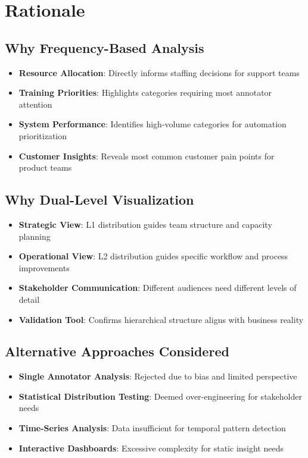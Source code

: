 \documentclass[11pt]{article}
\begin{document}
\section{Rationale}

\subsection{Why Frequency-Based Analysis}
\begin{itemize}
\item \textbf{Resource Allocation}: Directly informs staffing decisions for support teams
\item \textbf{Training Priorities}: Highlights categories requiring most annotator attention
\item \textbf{System Performance}: Identifies high-volume categories for automation prioritization
\item \textbf{Customer Insights}: Reveals most common customer pain points for product teams
\end{itemize}

\subsection{Why Dual-Level Visualization}
\begin{itemize}
\item \textbf{Strategic View}: L1 distribution guides team structure and capacity planning
\item \textbf{Operational View}: L2 distribution guides specific workflow and process improvements
\item \textbf{Stakeholder Communication}: Different audiences need different levels of detail
\item \textbf{Validation Tool}: Confirms hierarchical structure aligns with business reality
\end{itemize}

\subsection{Alternative Approaches Considered}
\begin{itemize}
\item \textbf{Single Annotator Analysis}: Rejected due to bias and limited perspective
\item \textbf{Statistical Distribution Testing}: Deemed over-engineering for stakeholder needs
\item \textbf{Time-Series Analysis}: Data insufficient for temporal pattern detection
\item \textbf{Interactive Dashboards}: Excessive complexity for static insight needs
\end{itemize}
\end{document}
